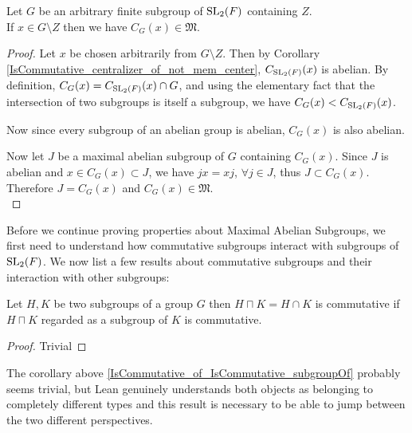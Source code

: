 \begin{theorem}
  \label{MaximalAbelianSubgroup.centralizer_meet_G_in_MaximalAbelianSubgroups_of_noncentral}
  \leanok 
  Let $G$ be an arbitrary finite subgroup of $\operatorname{SL}_2(F)$ containing $Z$. \\
If $x \in G \! \setminus \! Z$ then we have $C_G(x) \in \mathfrak{M}$. \vspace{3mm} \\
\end{theorem}
\begin{proof}
  \leanok
  Let $x$ be chosen arbitrarily from $G \! \setminus \! Z$. Then by Corollary \ref{IsCommutative_centralizer_of_not_mem_center}, $C_{\operatorname{SL}_2(F)}(x)$ is abelian. By definition, $C_G(x) = C_{\operatorname{SL}_2(F)}(x) \cap G$, 
  and using the elementary fact that the intersection of two subgroups is itself a subgroup, we have $C_G(x) < C_{\operatorname{SL}_2(F)}(x)$. 
  
  Now since every subgroup of an abelian group is abelian, $C_G(x)$ is also abelian.

  Now let $J$ be a maximal abelian subgroup of $G$ containing $C_G(x)$. Since $J$ is abelian and $x \in C_G(x) \subset J$, we have $jx=xj$, $\forall j \in J$, thus $J \subset C_G(x)$. Therefore $J=C_G(x)$ and $C_G(x) \in \mathfrak{M}$. \\
\end{proof}


Before we continue proving properties about Maximal Abelian Subgroups, we first need to understand how commutative subgroups interact with subgroups of $\operatorname{SL}_2(F)$. 
We now list a few results about commutative subgroups and their interaction with other subgroups:

\begin{corollary}
\label{IsCommutative_of_IsCommutative_subgroupOf}
\leanok
Let $H, K$ be two subgroups of a group $G$ then $H \sqcap K = H \cap K$ is commutative if $H \sqcap K$ regarded as a subgroup of $K$ is commutative.
\end{corollary}
\begin{proof}
  \leanok
Trivial
\end{proof}


\begin{remark}
  The corollary above \ref{IsCommutative_of_IsCommutative_subgroupOf} probably seems trivial, but Lean genuinely understands both objects as belonging to completely different types and 
  this result is necessary to be able to jump between the two different perspectives.
\end{remark}

